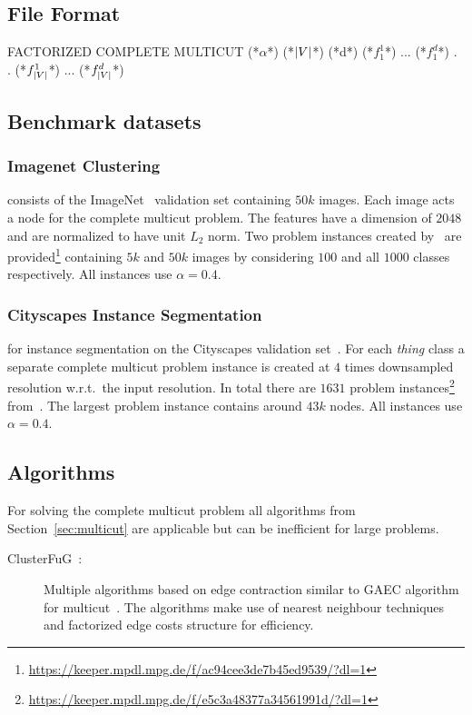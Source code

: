 \subsection{File Format}
\begin{fileformat}
FACTORIZED COMPLETE MULTICUT
(*$\alpha$*)
(*$\lvert V\rvert$*) (*d*)
(*$f_1^1$*) ... (*$f_1^d$*)
.
.
(*$f_{\lvert V\rvert}^1$*) ... (*$f_{\lvert V\rvert}^d$*)
\end{fileformat}
\subsection{Benchmark datasets}

\subsubsection{Imagenet Clustering}
consists of the ImageNet~\cite{deng2009imagenet} validation set containing $50k$ images.
Each image acts a node for the complete multicut problem.
The features have a dimension of $2048$ and are normalized to have unit $L_2$ norm.
Two problem instances created by~\cite{aabbas23_clusterfug} are provided\footnote{\url{https://keeper.mpdl.mpg.de/f/ac94cee3de7b45ed9539/?dl=1}} containing $5k$ and $50k$ images by considering $100$ and all $1000$ classes respectively. 
All instances use $\alpha = 0.4$.

\subsubsection{Cityscapes Instance Segmentation}
for instance segmentation on the Cityscapes validation set~\cite{cordts2016cityscapes}.
For each \textit{thing} class a separate complete multicut problem instance is created at $4$ times downsampled resolution w.r.t.\ the input resolution. 
In total there are $1631$ problem instances\footnote{\url{https://keeper.mpdl.mpg.de/f/e5c3a48377a34561991d/?dl=1}} from~\cite{aabbas23_clusterfug}.
The largest problem instance contains around $43k$ nodes. All instances use $\alpha = 0.4$.
\subsection{Algorithms}
For solving the complete multicut problem all algorithms from Section~\ref{sec:multicut} are applicable but can be inefficient for large problems. 
\begin{description}
\item[ClusterFuG~\cite{aabbas23_clusterfug}:] Multiple algorithms based on edge contraction similar to GAEC algorithm for multicut~\cite{keuper2015efficient}.
    The algorithms make use of nearest neighbour techniques and factorized edge costs structure for efficiency.
\end{description}
